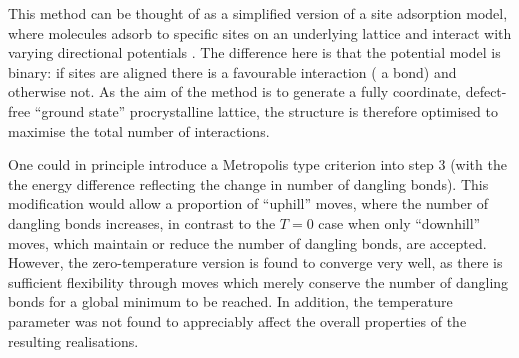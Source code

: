 This method can be thought of as a simplified version of a site adsorption model, where molecules adsorb to specific sites on an underlying lattice and interact with varying directional potentials \cite{Gorbunov2017,Nieckarz2018,Buzano2004}.
The difference here is that the potential model is binary: if sites are aligned there is a favourable interaction (\ie{} a bond) and otherwise not.
As the aim of the method is to generate a fully coordinate, defect\--free ``ground state'' procrystalline lattice, the structure is therefore optimised to maximise the total number of interactions.

One could in principle introduce a Metropolis type criterion into step 3 (with the the energy difference reflecting the change in number of dangling bonds).
This modification would allow a proportion of ``uphill'' moves, where the number of dangling bonds increases, in contrast to the $T=0$ case when only ``downhill'' moves, which maintain or reduce the number of dangling bonds, are accepted.
However, the zero\--temperature version is found to converge very well, as there is sufficient flexibility through moves which merely conserve the number of dangling bonds for a global minimum to be reached.
In addition, the temperature parameter was not found to appreciably affect the overall properties of the resulting realisations.

